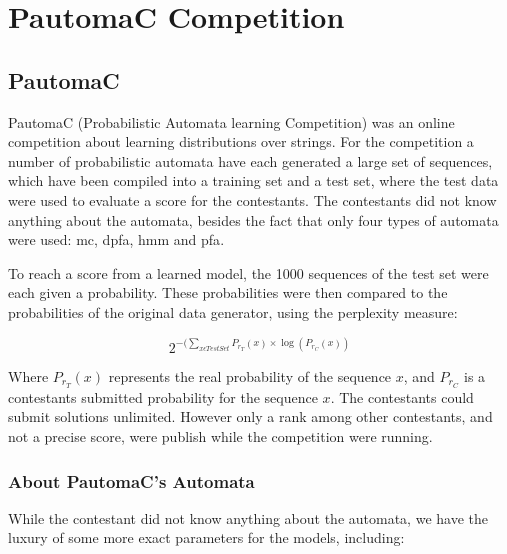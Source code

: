 \section{PautomaC Competition}
\label{sec:pautomac}
\subsection{PautomaC}
PautomaC (Probabilistic Automata learning Competition) was an online competition about learning distributions over strings. For the competition a number of probabilistic automata have each generated a large set of sequences, which have been compiled into a training set and a test set, where the test data were used to evaluate a score for the contestants.
The contestants did not know anything about the automata, besides the fact that only four types of automata were used: \gls{mc}, \gls{dpfa}, \gls{hmm} and \gls{pfa}.

To reach a score from a learned model, the 1000 sequences of the test set were each given a probability. These probabilities were then compared to the probabilities of the original data generator, using the perplexity measure:

\begin{equation} \label{eq:perplexity}
2^{-(\sum_{x\epsilon TestSet}P_{r_{T}}(x)\times\log(P_{r_{C}}(x))}
\end{equation}

Where $P_{r_{T}}(x)$ represents the real probability of the
sequence $x$, and $P_{r_{C}}$ is a contestants submitted probability for the sequence $x$.
The contestants could submit solutions unlimited. However only a rank among other contestants, and not a precise score, were publish while the competition were running.

\subsubsection{About PautomaC's Automata}
While the contestant did not know anything about the automata, we have the luxury of some more exact parameters for the models, including:

